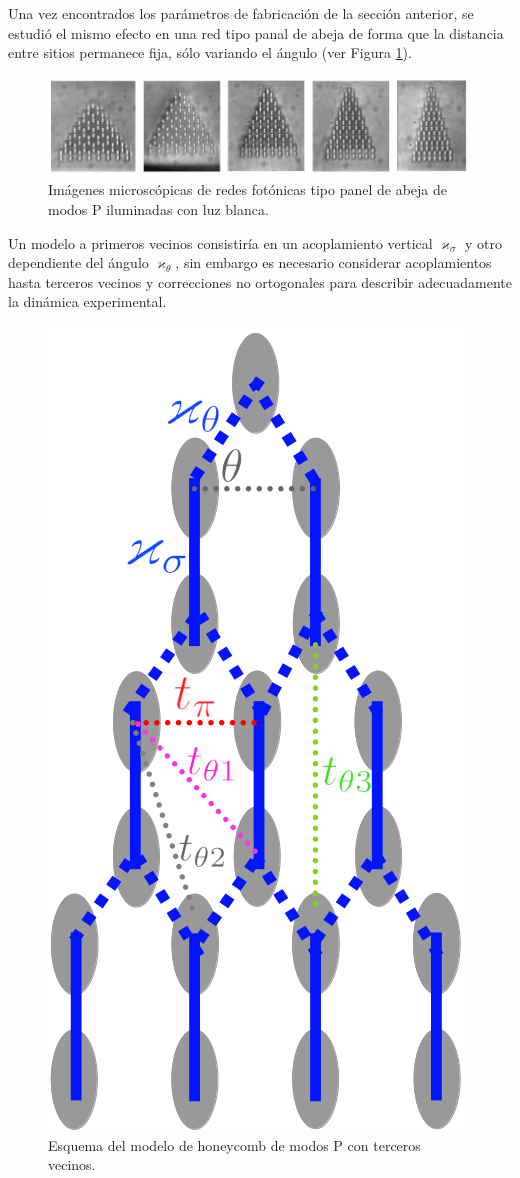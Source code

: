 Una vez encontrados los parámetros de fabricación de la sección anterior, se estudió el mismo efecto en una red tipo panal de abeja de forma que la distancia entre sitios permanece fija, sólo variando el ángulo (ver Figura \ref{fig:HCLBW}). 

\begin{figure}[H]
\centering
	\includegraphics[width=0.8\linewidth]{media/honeycomb_lattices_bw.png}
	\caption[Imágenes microscópicas de redes fotónicas tipo panel de abeja de modos P.]{Imágenes microscópicas de redes fotónicas tipo panel de abeja de modos P iluminadas con luz blanca. \label{fig:HCLBW}}
\end{figure}

Un modelo a primeros vecinos consistiría en un acoplamiento vertical $\varkappa_\sigma$ y otro dependiente del ángulo $\varkappa_\theta$, sin embargo es necesario considerar acoplamientos hasta terceros vecinos y correcciones no ortogonales para describir adecuadamente la dinámica experimental.

\begin{figure}[H]
\centering
\includegraphics[width=0.3\linewidth]{media/honeycomb-lattice.png}
\caption{Esquema del modelo de honeycomb de modos P con terceros vecinos.}
\end{figure}